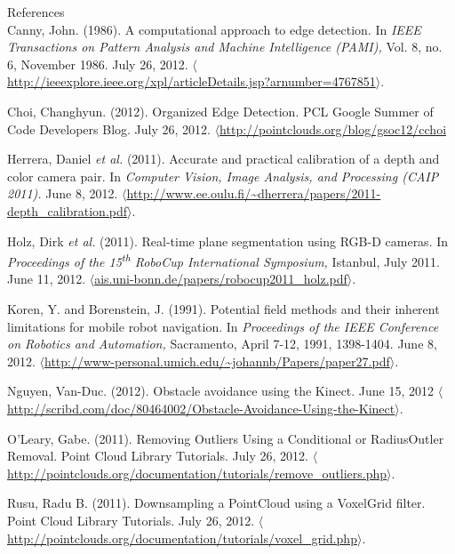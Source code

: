 \documentclass[12pt]{report}
\renewcommand{\large}{\fontsize{14pt}{14pt}\selectfont}
\begin{document}
\clearpage
{}
{}
{\large References} \\
\linebreak
{}
\label{bib:canny}
Canny, John. (1986). A computational approach to edge detection. In \textit{IEEE Transactions on Pattern Analysis and Machine Intelligence (PAMI),} Vol. 8, no. 6, November 1986. July 26, 2012. $\langle$\url{http://ieeexplore.ieee.org/xpl/articleDetails.jsp?arnumber=4767851}$\rangle$.

\label{bib:choi}
Choi, Changhyun. (2012). Organized Edge Detection. PCL Google Summer of Code Developers Blog. July 26, 2012. $\langle$\url{http://pointclouds.org/blog/gsoc12/cchoi}

\label{bib:herrera}
Herrera, Daniel \textit{et al.} (2011). Accurate and practical calibration of a depth and color camera pair. In \textit{Computer Vision, Image Analysis, and Processing (CAIP 2011).} June 8, 2012. $\langle$\url{http://www.ee.oulu.fi/~dherrera/papers/2011-depth_calibration.pdf}$\rangle$.

\label{bib:holz}
Holz, Dirk \textit{et al.} (2011). Real-time plane segmentation using RGB-D cameras. In \textit{Proceedings of the 15\textsuperscript{th} RoboCup International Symposium,} Istanbul, July 2011. June 11, 2012. $\langle$\url{ais.uni-bonn.de/papers/robocup2011_holz.pdf}$\rangle$.

\label{bib:koren}
Koren, Y. and Borenstein, J. (1991). Potential field methods and their inherent limitations for mobile robot navigation. In \textit{Proceedings of the IEEE Conference on Robotics and Automation,} Sacramento, April 7-12, 1991, 1398-1404. June 8, 2012. $\langle$\url{http://www-personal.umich.edu/~johannb/Papers/paper27.pdf}$\rangle$.

\begin{sloppypar}
\label{bib:nguyen}
Nguyen, Van-Duc. (2012). Obstacle avoidance using the Kinect. June 15, 2012 $\langle$\url{http://scribd.com/doc/80464002/Obstacle-Avoidance-Using-the-Kinect}$\rangle$.
\end{sloppypar}

\label{bib:oleary}
O'Leary, Gabe. (2011). Removing Outliers Using a Conditional or RadiusOutler Removal. Point Cloud Library Tutorials. July 26, 2012. $\langle$\url{http://pointclouds.org/documentation/tutorials/remove_outliers.php}$\rangle$.

\label{bib:rusu}
Rusu, Radu B. (2011). Downsampling a PointCloud using a VoxelGrid filter. Point Cloud Library Tutorials. July 26, 2012. $\langle$\url{http://pointclouds.org/documentation/tutorials/voxel_grid.php}$\rangle$.
\end{document}
